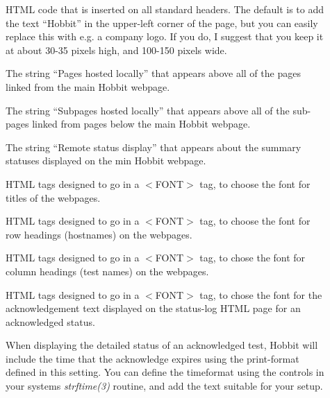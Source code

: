  \begin{description}

\item[] HTML code that is inserted on all standard
  headers. The default is to add the text ``Hobbit'' in the upper-left
  corner of the page, but you can easily replace this with e.g. a
  company logo. If you do, I suggest that you keep it at about 30-35
  pixels high, and 100-150 pixels wide. 


 

\item[] The string ``Pages hosted locally'' that
  appears above all of the pages linked from the main Hobbit webpage. 


 

\item[] The string ``Subpages hosted locally''
  that appears above all of the sub-pages linked from pages below the
  main Hobbit webpage. 


 

\item[] The string ``Remote status display'' that
  appears about the summary statuses displayed on the min Hobbit
  webpage. 


 

\item[] HTML tags designed to go in a $<$FONT$>$ tag,
  to choose the font for titles of the webpages. 


 

\item[] HTML tags designed to go in a $<$FONT$>$
  tag, to choose the font for row headings (hostnames) on the
  webpages. 


 

\item[] HTML tags designed to go in a $<$FONT$>$
  tag, to chose the font for column headings (test names) on the
  webpages. 


 

\item[] HTML tags designed to go in a $<$FONT$>$
  tag, to chose the font for the acknowledgement text displayed on the
  status-log HTML page for an acknowledged status. 


 

\item[] When displaying the detailed status of an
  acknowledged test, Hobbit will include the time that the acknowledge
  expires using the print-format defined in this setting. You can
  define the timeformat using the controls in your systems
  \emph{strftime(3)} routine, and add the text suitable for your
  setup. 



\end{description}
